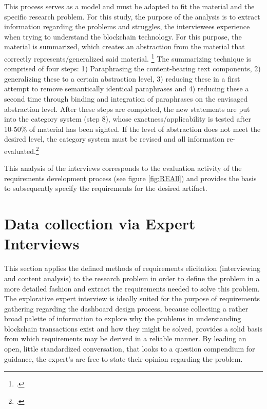 This process serves as a model and must be adapted to fit the material and the specific research problem. For this study, the purpose of the analysis is to extract information regarding the problems and struggles, the interviewees experience when trying to understand the blockchain technology. For this purpose, the material is summarized, which creates an abstraction from the material that correctly represents/generalized said material. \footcite[Cf.][p.68]{MayringQualitativeContentAnalysis2014} The summarizing technique is comprised of four steps: 1) Paraphrasing the content-bearing text components, 2) generalizing these to a certain abstraction level, 3) reducing these in a first attempt to remove semantically identical paraphrases and 4) reducing these a second time through binding and integration of paraphrases on the envisaged abstraction level. After these steps are completed, the new statements are put into the category system (step 8), whose exactness/applicability is tested after 10-50\% of material has been sighted. If the level of abstraction does not meet the desired level, the category system must be revised and all information re-evaluated.\footcite[Cf.][p.68 et seq]{MayringQualitativeContentAnalysis2014}

This analysis of the interviews corresponds to the evaluation activity of the requirements development process (see figure \ref{fig:REAll}) and provides the basis to subsequently specify the requirements for the desired artifact. 

\section{Data collection via Expert Interviews}
This section applies the defined methods of requirements elicitation (interviewing and content analysis) to the research problem in order to define the problem in a more detailed fashion and extract the requirements needed to solve this problem. 
The explorative expert interview is ideally suited for the purpose of requirements gathering regarding the dashboard design process, because collecting a rather broad palette of information to explore why the problems in understanding blockchain transactions exist and how they might be solved, provides a solid basis from which requirements may be derived in a reliable manner. By leading an open, little standardized conversation, that looks to a question compendium for guidance, the expert's are free to state their opinion regarding the problem.
